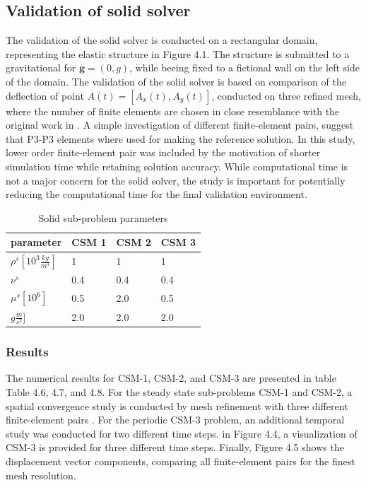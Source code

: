 \subsection{Validation of solid solver}
The validation of the solid solver is conducted on a rectangular domain, representing the elastic structure in Figure 4.1.  The structure is submitted to a gravitational for $\mathbf{g} = (0, g)$, while beeing fixed to a fictional wall on the left side of the domain. The validation of the solid solver is based on comparison of the deflection of point $A(t) = [A_x(t), A_y(t)]$,  conducted on three refined mesh, where the number of finite elements are chosen in close resemblance with the original work in \cite{Hron2006}. A simple investigation of different finite-element pairs, suggest that P3-P3 elements where used for making the reference solution. In this study, lower order finite-element pair was included by the motivation of shorter simulation time while retaining solution accuracy. While computational time is not a major concern for the solid solver, the study is important for potentially reducing the computational time for the final validation environment.

\begin{table}[h!]
\centering
\label{my-label}
\begin{tabular}{ |p{3cm}||p{2cm}|p{2cm}|p{2cm}|  }
 \hline
 parameter              & CSM 1 & CSM 2 & CSM 3 \\
 \hline
$\rho^s [10^{3}\frac{kg}{m^3}]$ & 1    & 1    & 1    \\
$\nu^s $  & 0.4    & 0.4    & 0.4    \\
$\mu^s  [10^{6}]$  & 0.5    & 2.0    & 0.5    \\
$g  \frac{m}{s^2}]$  & 2.0    & 2.0    & 2.0    \\
\hline
\end{tabular}
\caption{Solid sub-problem parameters}
\end{table}

\newpage

\subsubsection*{Results}
The numerical results for CSM-1, CSM-2, and CSM-3 are presented in table Table 4.6, 4.7, and 4.8. For the steady state sub-problems CSM-1 and CSM-2, a spatial convergence study is conducted by mesh refinement with three different finite-element pairs . For the periodic CSM-3 problem, an additional temporal study was conducted for two different time steps. in Figure 4.4, a visualization of CSM-3 is provided for three different time steps. Finally, Figure 4.5 shows the displacement vector components, comparing all finite-element pairs for the finest mesh resolution.

